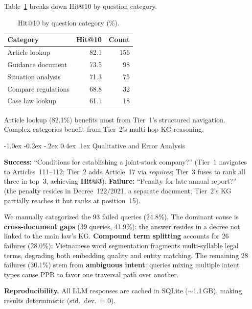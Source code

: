 \documentclass{IOS-Book-Article}
\makeatletter
\renewcommand\subsubsection{\@startsection{subsubsection}{3}{\z@}%
  {-1.0ex \@plus -0.2ex \@minus -.2ex}%
  {0.4ex \@plus .1ex}%
  {\normalfont\normalsize\itshape}}
\makeatother
\begin{document}
Table~\ref{tab:category-results} breaks down Hit@10 by question category.

\begin{table}[H]
\centering\footnotesize
\caption{Hit@10 by question category (\%).}
\label{tab:category-results}
\begin{tabular}{lrr}
\toprule
\textbf{Category} & \textbf{Hit@10} & \textbf{Count} \\
\midrule
Article lookup & 82.1 & 156 \\
Guidance document & 73.5 & 98 \\
Situation analysis & 71.3 & 75 \\
Compare regulations & 68.8 & 32 \\
Case law lookup & 61.1 & 18 \\
\bottomrule
\end{tabular}
\end{table}

Article lookup (82.1\%) benefits most from Tier~1's structured navigation. Complex categories benefit from Tier~2's multi-hop KG reasoning.

\subsubsection{Qualitative and Error Analysis}

\textbf{Success:} ``Conditions for establishing a joint-stock company?'' (Tier~1 navigates to Articles~111--112; Tier~2 adds Article~17 via \textit{requires}; Tier~3 fuses to rank all three in top~3, achieving \textbf{Hit@3}).
\textbf{Failure:} ``Penalty for late annual report?'' (the penalty resides in Decree~122/2021, a separate document; Tier~2's KG partially reaches it but ranks at position~15).

We manually categorized the 93 failed queries (24.8\%). The dominant cause is \textbf{cross-document gaps} (39 queries, 41.9\%): the answer resides in a decree not linked to the main law's KG. \textbf{Compound term splitting} accounts for 26 failures (28.0\%): Vietnamese word segmentation fragments multi-syllable legal terms, degrading both embedding quality and entity matching. The remaining 28 failures (30.1\%) stem from \textbf{ambiguous intent}: queries mixing multiple intent types cause PPR to favor one traversal path over another.


\textbf{Reproducibility.} All LLM responses are cached in SQLite ($\sim$1.1\,GB), making results deterministic (std.\ dev.\ = 0).
\end{document}
